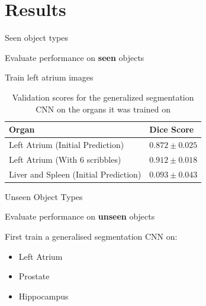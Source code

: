 \documentclass[10pt]{beamer}
\begin{document}



\section{Results}

\begin{frame}[fragile]{Seen object types}

  Evaluate performance on \textbf{seen} objects

  Train left atrium images

 
  \begin{table}[h!]
    \centering
    \begin{tabular}{|l|l|}
      \hline
      Organ   & Dice Score         \\ \hline
      Left Atrium (Initial Prediction)  & $0.872 \pm 0.025$ \\ 
      Left Atrium (With 6 scribbles)     & $0.912 \pm 0.018$ \\ 
      Liver and Spleen (Initial Prediction)  & $0.093 \pm 0.043$ \\ \hline
    \end{tabular}
    \caption{Validation scores for the generalized segmentation CNN on the organs it was trained on}
    \label{tab:resGen}
  \end{table}
  
\end{frame}



%
%

\begin{frame}[fragile]{Unseen Object Types}

  Evaluate performance on \textbf{unseen} objects

  First train a generalised segmentation CNN on:
  \begin{itemize}
  \item Left Atrium
  \item Prostate
  \item Hippocampus
  \end{itemize}
  
\end{frame}
\end{document}
